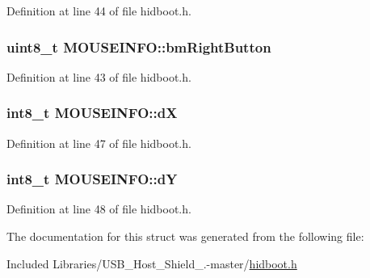 \-Definition at line 44 of file hidboot.\-h.

\hypertarget{struct_m_o_u_s_e_i_n_f_o_a07f604e1dffc0a72fa28e94a5094ebbe}{
\subsubsection[{bm\-Right\-Button}]{\setlength{\rightskip}{0pt plus 5cm}uint8\-\_\-t {\bf \-M\-O\-U\-S\-E\-I\-N\-F\-O\-::bm\-Right\-Button}}}\label{struct_m_o_u_s_e_i_n_f_o_a07f604e1dffc0a72fa28e94a5094ebbe}


\-Definition at line 43 of file hidboot.\-h.

\hypertarget{struct_m_o_u_s_e_i_n_f_o_a8b67db1c54e5db9782a0b5b707dcf9db}{
\subsubsection[{d\-X}]{\setlength{\rightskip}{0pt plus 5cm}int8\-\_\-t {\bf \-M\-O\-U\-S\-E\-I\-N\-F\-O\-::d\-X}}}\label{struct_m_o_u_s_e_i_n_f_o_a8b67db1c54e5db9782a0b5b707dcf9db}


\-Definition at line 47 of file hidboot.\-h.

\hypertarget{struct_m_o_u_s_e_i_n_f_o_ae7192500776548f5c6868cc37eaaabb2}{
\subsubsection[{d\-Y}]{\setlength{\rightskip}{0pt plus 5cm}int8\-\_\-t {\bf \-M\-O\-U\-S\-E\-I\-N\-F\-O\-::d\-Y}}}\label{struct_m_o_u_s_e_i_n_f_o_ae7192500776548f5c6868cc37eaaabb2}


\-Definition at line 48 of file hidboot.\-h.



\-The documentation for this struct was generated from the following file\-:\begin{DoxyCompactItemize}
\item 
\-Included Libraries/\-U\-S\-B\-\_\-\-Host\-\_\-\-Shield\-\_.-\/master/\hyperlink{hidboot_8h}{hidboot.\-h}\end{DoxyCompactItemize}
